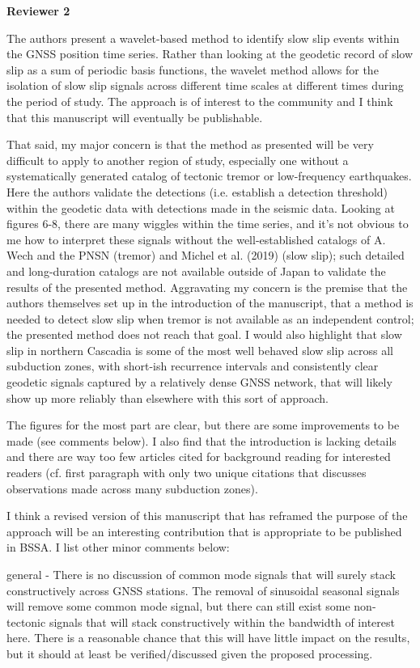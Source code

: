 \documentclass[letterpaper, 12pt]{article}
\begin{document}
\textbf{Reviewer 2}

The authors present a wavelet-based method to identify slow slip events within the GNSS position time series. Rather than looking at the geodetic record of slow slip as a sum of periodic basis functions, the wavelet method allows for the isolation of slow slip signals across different time scales at different times during the period of study. The approach is of interest to the community and I think that this manuscript will eventually be publishable.

That said, my major concern is that the method as presented will be very difficult to apply to another region of study, especially one without a systematically generated catalog of tectonic tremor or low-frequency earthquakes. Here the authors validate the detections (i.e. establish a detection threshold) within the geodetic data with detections made in the seismic data. Looking at figures 6-8, there are many wiggles within the time series, and it's not obvious to me how to interpret these signals without the well-established catalogs of A. Wech and the PNSN (tremor) and Michel et al. (2019) (slow slip); such detailed and long-duration catalogs are not available outside of Japan to validate the results of the presented method. Aggravating my concern is the premise that the authors themselves set up in the introduction of the manuscript, that a method is needed to detect slow slip when tremor is not available as an independent control; the presented method does not reach that
goal. I would also highlight that slow slip in northern Cascadia is some of the most well behaved slow slip across all subduction zones, with short-ish recurrence intervals and consistently clear geodetic signals captured by a relatively dense GNSS network, that will likely show up more reliably than elsewhere with this sort of approach.

The figures for the most part are clear, but there are some improvements to be made (see comments below). I also find that the introduction is lacking details and there are way too few articles cited for background reading for interested readers (cf. first paragraph with only two unique citations that discusses observations made across many subduction zones).

I think a revised version of this manuscript that has reframed the purpose of the approach will be an interesting contribution that is appropriate to be published in BSSA. I list other minor comments below:

general - There is no discussion of common mode signals that will surely stack constructively across GNSS stations. The removal of sinusoidal seasonal signals will remove some common mode signal, but there can still exist some non-tectonic signals that will stack constructively within the bandwidth of interest here. There is a reasonable chance that this will have little impact on the results, but it should at least be verified/discussed given the proposed processing.
\end{document}
